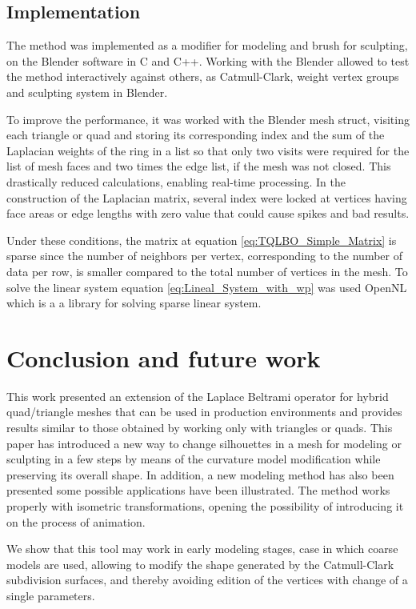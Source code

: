 \documentclass[10pt, conference]{IEEEtran}
\begin{document}
\subsection{Implementation\label{sub:Implementation}}

The method was implemented as a modifier for modeling and brush for
sculpting, on the Blender software \cite{blender} in C and C++. Working
with the Blender allowed to test the method interactively against
others, as Catmull-Clark, weight vertex groups and sculpting system
in Blender.

To improve the performance, it was worked with the Blender mesh struct,
visiting each triangle or quad and storing its corresponding index
and the sum of the Laplacian weights of the ring in a list so that
only two visits were required for the list of mesh faces and two times
the edge list, if the mesh was not closed. This drastically reduced
calculations, enabling real-time processing. In the construction of
the Laplacian matrix, several index were locked at vertices having
face areas or edge lengths with zero value that could cause spikes
and bad results.

Under these conditions, the matrix at equation \ref{eq:TQLBO_Simple_Matrix}
is sparse since the number of neighbors per vertex, corresponding
to the number of data per row, is smaller compared to the total number
of vertices in the mesh. To solve the linear system equation \ref{eq:Lineal_System_with_wp}
was used OpenNL \cite{Buatois2007}  which is a a library for solving sparse linear system.


\section{Conclusion and future work\label{sec:Conclusion-and-future}}

This work presented an extension of the Laplace Beltrami operator
for hybrid quad/triangle meshes that can be used in production environments
and provides results similar to those obtained by working only with
triangles or quads. This paper has introduced a new way to change
silhouettes in a mesh for modeling or sculpting in a few steps by
means of the curvature model modification while preserving its overall
shape. In addition, a new modeling method has also been presented
some possible applications have been illustrated. The method works
properly with isometric transformations, opening the possibility of
introducing it on the process of animation.

We show that this tool may work in early modeling stages, case in
which coarse models are used, allowing to modify the shape generated
by the Catmull-Clark subdivision surfaces, and thereby avoiding edition
of the vertices with change of a single parameters.
\end{document}
